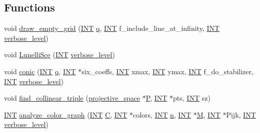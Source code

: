 \subsection*{Functions}
\begin{DoxyCompactItemize}
\item 
void \mbox{\hyperlink{conic_8_c_a0a991c7d8313e303d51bea14da7b490a}{draw\+\_\+empty\+\_\+grid}} (\mbox{\hyperlink{galois_8h_a09fddde158a3a20bd2dcadb609de11dc}{I\+NT}} \mbox{\hyperlink{simeon_8_c_a92cbb483a3b27ae1a0dbfcb125ce216f}{q}}, \mbox{\hyperlink{galois_8h_a09fddde158a3a20bd2dcadb609de11dc}{I\+NT}} f\+\_\+include\+\_\+line\+\_\+at\+\_\+infinity, \mbox{\hyperlink{galois_8h_a09fddde158a3a20bd2dcadb609de11dc}{I\+NT}} \mbox{\hyperlink{simeon_8_c_a818073fbcc2f439e7c56952f67386122}{verbose\+\_\+level}})
\item 
void \mbox{\hyperlink{conic_8_c_aff3f16a42ec8b9efa78fc209b8ab5452}{Lunelli\+Sce}} (\mbox{\hyperlink{galois_8h_a09fddde158a3a20bd2dcadb609de11dc}{I\+NT}} \mbox{\hyperlink{simeon_8_c_a818073fbcc2f439e7c56952f67386122}{verbose\+\_\+level}})
\item 
void \mbox{\hyperlink{conic_8_c_a96def9474b981a9d5831a9b48d85d652}{conic}} (\mbox{\hyperlink{galois_8h_a09fddde158a3a20bd2dcadb609de11dc}{I\+NT}} \mbox{\hyperlink{simeon_8_c_a92cbb483a3b27ae1a0dbfcb125ce216f}{q}}, \mbox{\hyperlink{galois_8h_a09fddde158a3a20bd2dcadb609de11dc}{I\+NT}} $\ast$six\+\_\+coeffs, \mbox{\hyperlink{galois_8h_a09fddde158a3a20bd2dcadb609de11dc}{I\+NT}} xmax, \mbox{\hyperlink{galois_8h_a09fddde158a3a20bd2dcadb609de11dc}{I\+NT}} ymax, \mbox{\hyperlink{galois_8h_a09fddde158a3a20bd2dcadb609de11dc}{I\+NT}} f\+\_\+do\+\_\+stabilizer, \mbox{\hyperlink{galois_8h_a09fddde158a3a20bd2dcadb609de11dc}{I\+NT}} \mbox{\hyperlink{simeon_8_c_a818073fbcc2f439e7c56952f67386122}{verbose\+\_\+level}})
\item 
void \mbox{\hyperlink{conic_8_c_aba2738ae81f937c578b3555827ebf416}{find\+\_\+collinear\+\_\+triple}} (\mbox{\hyperlink{classprojective__space}{projective\+\_\+space}} $\ast$\mbox{\hyperlink{simeon_8_c_a7fa15551e800919e93401fbbcd8e71e8}{P}}, \mbox{\hyperlink{galois_8h_a09fddde158a3a20bd2dcadb609de11dc}{I\+NT}} $\ast$pts, \mbox{\hyperlink{galois_8h_a09fddde158a3a20bd2dcadb609de11dc}{I\+NT}} sz)
\item 
\mbox{\hyperlink{galois_8h_a09fddde158a3a20bd2dcadb609de11dc}{I\+NT}} \mbox{\hyperlink{conic_8_c_a66a6d803901f79188a817ee431b3ffeb}{analyze\+\_\+color\+\_\+graph}} (\mbox{\hyperlink{galois_8h_a09fddde158a3a20bd2dcadb609de11dc}{I\+NT}} \mbox{\hyperlink{costas_8_c_aacbbb35f36efadbb40803bfb5480b737}{C}}, \mbox{\hyperlink{galois_8h_a09fddde158a3a20bd2dcadb609de11dc}{I\+NT}} $\ast$colors, \mbox{\hyperlink{galois_8h_a09fddde158a3a20bd2dcadb609de11dc}{I\+NT}} \mbox{\hyperlink{simeon_8_c_a7f2cd26777ce0ff3fdaf8d02aacbddfb}{n}}, \mbox{\hyperlink{galois_8h_a09fddde158a3a20bd2dcadb609de11dc}{I\+NT}} $\ast$\mbox{\hyperlink{plane__search_8_c_ad2d23ebd03187a91edd45b1d5e496265}{M}}, \mbox{\hyperlink{galois_8h_a09fddde158a3a20bd2dcadb609de11dc}{I\+NT}} $\ast$Pijk, \mbox{\hyperlink{galois_8h_a09fddde158a3a20bd2dcadb609de11dc}{I\+NT}} \mbox{\hyperlink{simeon_8_c_a818073fbcc2f439e7c56952f67386122}{verbose\+\_\+level}})

\end{DoxyCompactItemize}
